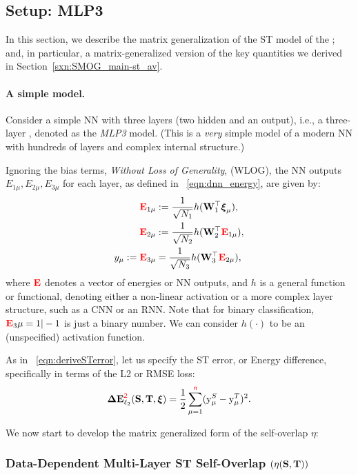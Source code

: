 \subsection{\MultiLayer Setup: MLP3}
\label{sxn:matgen_mlp3}

In this section, we describe the matrix generalization of the ST  model of the \LinearPerceptron; and, 
in particular, a matrix-generalized version of the key quantities we derived in Section~\ref{sxn:SMOG_main-st_av}.

\paragraph{A simple model.}

Consider a simple NN with three layers (two hidden and an output), i.e., a three-layer \MultiLayerPerceptron, denoted as the \emph{MLP3} model.
(This is a \emph{very} simple model of a modern NN with hundreds of layers and complex internal structure.)

Ignoring the bias terms, \emph{Without Loss of Generality}, (WLOG), the NN outputs
 $E_{1\mu},E_{2\mu},E_{3\mu}$ for each layer, as defined in \EQN~\ref{eqn:dnn_energy}, are given by:
\begin{align}
\nonumber
  {{\color{red}\sf{\mathbf{E}}}}_{1\mu} &:= \frac{1}{\sqrt{N_1}} h ({\mathbf{W}}_1^\top \boldsymbol{\xi}_{\mu}) , \\
\nonumber
  {{\color{red}\sf{\mathbf{E}}}}_{2\mu} &:= \frac{1}{\sqrt{N_2}} h ({\mathbf{W}}_2^\top {{\color{red}\sf{\mathbf{E}}}}_{1\mu})     , \\
\label{eqn:nflow}
             y_{\mu} := {{\color{red}\sf{\mathbf{E}}}}_{3\mu} &= \frac{1}{\sqrt{N_3}} h ({\mathbf{W}}_{3}^\top {{\color{red}\sf{\mathbf{E}}}}_{2\mu})     ,
\end{align}
where ${{\color{red}\sf{\mathbf{E}}}}$ denotes a vector of energies or NN outputs, and $h$ is a general function or functional, denoting either a non-linear activation or a more complex layer structure, such as a CNN or an RNN.  Note that for binary classification, ${{\color{red}\sf{\mathbf{E}}}}_3{\mu}=1|-1$ is just a binary number.  
We can consider $h(\cdot)$ to be an (unspecified) activation function.

As in \EQN~\ref{eqn:deriveSTerror}, let us specify the ST error, or Energy difference, specifically in terms of the L2 or RMSE loss:
\begin{equation}
\label{eqn:DE}
\mathbf{\Delta {E}}^{{\color{red}\sf{2}}}_{\ell_2}({\mathbf{S}},{\mathbf{T}}, \boldsymbol{\xi}) = \frac{1}{2}\sum_{\mu=1}^{{\color{red}\sf{n}}} (\mathrm{y}_{\mu}^{S} - \mathrm{y}_{\mu}^{T})^2.
\end{equation}

We now start to develop the  matrix generalized form of the self-overlap \(\eta\):

\subsubsection{Data-Dependent Multi-Layer ST Self-Overlap
\texorpdfstring{$(\eta({\mathbf{S}},{\mathbf{T}}))$}{ETA(S, T)}}

